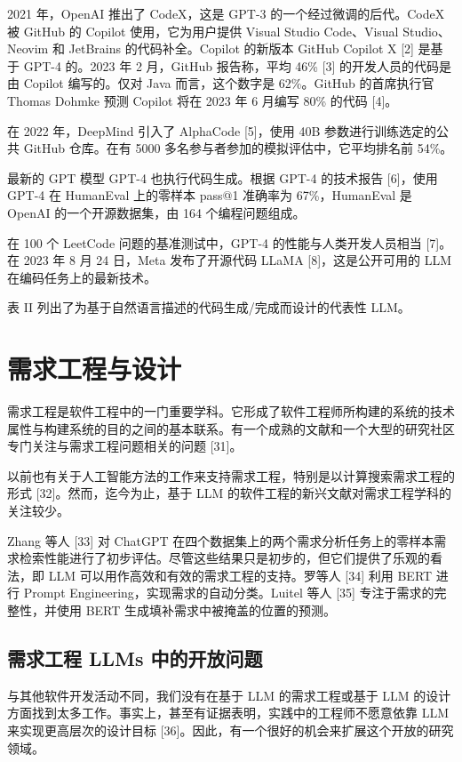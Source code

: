 \begin{translation}
2021 年，OpenAI 推出了 CodeX，这是 GPT-3 的一个经过微调的后代。CodeX 被 GitHub 的 Copilot 使用，它为用户提供 Visual Studio Code、Visual Studio、Neovim 和 JetBrains 的代码补全。Copilot 的新版本 GitHub Copilot X [2] 是基于 GPT-4 的。2023 年 2 月，GitHub 报告称，平均 46\% [3] 的开发人员的代码是由 Copilot 编写的。仅对 Java 而言，这个数字是 62\%。GitHub 的首席执行官 Thomas Dohmke 预测 Copilot 将在 2023 年 6 月编写 80\% 的代码 [4]。

在 2022 年，DeepMind 引入了 AlphaCode [5]，使用 40B 参数进行训练选定的公共 GitHub 仓库。在有 5000 多名参与者参加的模拟评估中，它平均排名前 54\%。

最新的 GPT 模型 GPT-4 也执行代码生成。根据 GPT-4 的技术报告 [6]，使用 GPT-4 在 HumanEval 上的零样本 pass@1 准确率为 67\%，HumanEval 是 OpenAI 的一个开源数据集，由 164 个编程问题组成。

在 100 个 LeetCode 问题的基准测试中，GPT-4 的性能与人类开发人员相当 [7]。在 2023 年 8 月 24 日，Meta 发布了开源代码 LLaMA [8]，这是公开可用的 LLM 在编码任务上的最新技术。

表 II 列出了为基于自然语言描述的代码生成/完成而设计的代表性 LLM。

\section{需求工程与设计}

需求工程是软件工程中的一门重要学科。它形成了软件工程师所构建的系统的技术属性与构建系统的目的之间的基本联系。有一个成熟的文献和一个大型的研究社区专门关注与需求工程问题相关的问题 [31]。

以前也有关于人工智能方法的工作来支持需求工程，特别是以计算搜索需求工程的形式 [32]。然而，迄今为止，基于 LLM 的软件工程的新兴文献对需求工程学科的关注较少。

Zhang 等人 [33] 对 ChatGPT 在四个数据集上的两个需求分析任务上的零样本需求检索性能进行了初步评估。尽管这些结果只是初步的，但它们提供了乐观的看法，即 LLM 可以用作高效和有效的需求工程的支持。罗等人 [34] 利用 BERT 进行 Prompt Engineering，实现需求的自动分类。Luitel 等人 [35] 专注于需求的完整性，并使用 BERT 生成填补需求中被掩盖的位置的预测。

\subsection{需求工程 LLMs 中的开放问题}

与其他软件开发活动不同，我们没有在基于 LLM 的需求工程或基于 LLM 的设计方面找到太多工作。事实上，甚至有证据表明，实践中的工程师不愿意依靠 LLM 来实现更高层次的设计目标 [36]。因此，有一个很好的机会来扩展这个开放的研究领域。


\end{translation}
